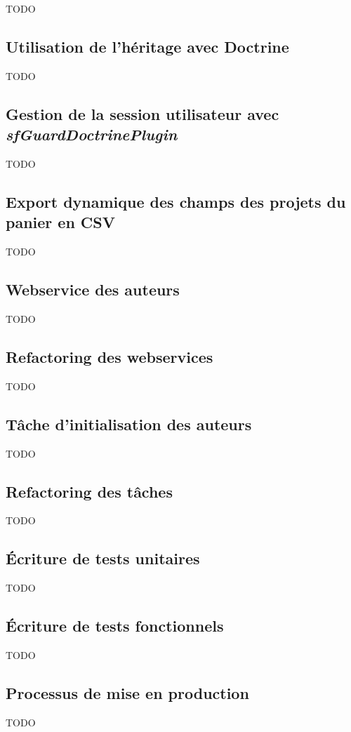 TODO





\subsection{Utilisation de l'héritage avec Doctrine}

TODO

\subsection{Gestion de la session utilisateur avec \textit{sfGuardDoctrinePlugin}}

TODO

\subsection{Export dynamique des champs des projets du panier en CSV}

TODO

\subsection{Webservice des auteurs}

TODO

\subsection{Refactoring des webservices}

TODO

\subsection{Tâche d'initialisation des auteurs}

TODO

\subsection{Refactoring des tâches}

TODO

\subsection{Écriture de tests unitaires}

TODO

\subsection{Écriture de tests fonctionnels}

TODO

\subsection{Processus de mise en production}

TODO
